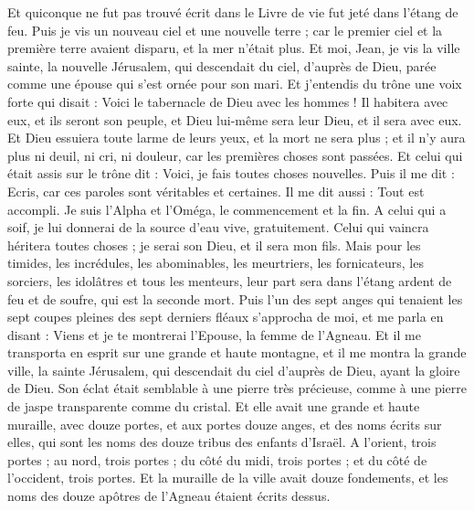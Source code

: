 \begin{multicols}{2}
Et quiconque ne fut pas trouvé écrit dans le Livre de vie fut jeté dans l'étang de feu.
\VerseOne{}Puis je vis un nouveau ciel et une nouvelle terre ; car le premier ciel et la première terre avaient disparu, et la mer n'était plus.
Et moi, Jean, je vis la ville sainte, la nouvelle Jérusalem, qui descendait du ciel, d’auprès de Dieu, parée comme une épouse qui s'est ornée pour son mari.
Et j'entendis du trône une voix forte qui disait : Voici le tabernacle de Dieu avec les hommes ! Il habitera avec eux, et ils seront son peuple, et Dieu lui-même sera leur Dieu, et il sera avec eux.
Et Dieu essuiera toute larme de leurs yeux, et la mort ne sera plus ; et il n'y aura plus ni deuil, ni cri, ni douleur, car les premières choses sont passées.
Et celui qui était assis sur le trône dit : Voici, je fais toutes choses nouvelles. Puis il me dit : Ecris, car ces paroles sont véritables et certaines.
Il me dit aussi : Tout est accompli. Je suis l'Alpha et l'Oméga, le commencement et la fin. A celui qui a soif, je lui donnerai de la source d'eau vive, gratuitement{}.
Celui qui vaincra héritera toutes choses ; je serai son Dieu, et il sera mon fils.
Mais pour les timides, les incrédules, les abominables, les meurtriers, les fornicateurs, les sorciers, les idolâtres et tous les menteurs, leur part sera dans l'étang ardent de feu et de soufre, qui est la seconde mort.
Puis l’un des sept anges qui tenaient les sept coupes pleines des sept derniers fléaux s'approcha de moi, et me parla en disant : Viens et je te montrerai l'Epouse, la femme de l'Agneau.
Et il me transporta en esprit sur une grande et haute montagne, et il me montra la grande ville, la sainte Jérusalem, qui descendait du ciel d’auprès de Dieu,
ayant la gloire de Dieu. Son éclat était semblable à une pierre très précieuse, comme à une pierre de jaspe transparente comme du cristal.
Et elle avait une grande et haute muraille, avec douze portes, et aux portes douze anges, et des noms écrits sur elles, qui sont les noms des douze tribus des enfants d'Israël{}.
A l'orient, trois portes ; au nord, trois portes ; du côté du midi, trois portes ; et du côté de l'occident, trois portes.
Et la muraille de la ville avait douze fondements, et les noms des douze apôtres de l'Agneau étaient écrits dessus{}.

\end{multicols}
